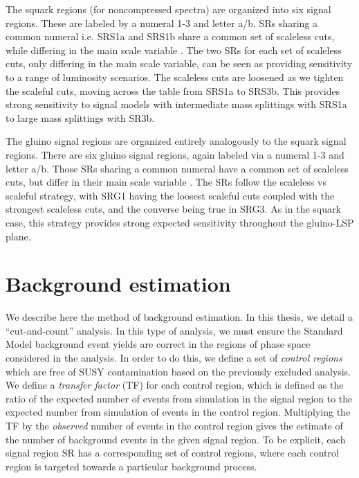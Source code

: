 The squark regions (for noncompressed spectra) are organized into six signal regions.
These are labeled by a numeral 1-3 and letter a/b.
SRs sharing a common numeral i.e. SRS1a and SRS1b share a common set of scaleless cuts, while differing in the main scale variable .
The two SRs for each set of scaleless cuts, only differing in the main scale variable, can be seen as providing sensitivity to a range of luminosity scenarios\footnotemark.
The scaleless cuts are loosened as we tighten the scaleful cuts, moving across the table from SRS1a to SRS3b.
This provides strong sensitivity to signal models with intermediate mass splittings with SRS1a to large mass splittings with SR3b.

The gluino signal regions are organized entirely analogously to the squark signal regions.
There are six gluino signal regions, again labeled via a numeral 1-3 and letter a/b.
Those SRs sharing a common numeral have a common set of scaleless cuts, but differ in their main scale variable .
The SRs follow the scaleless vs scaleful strategy, with SRG1 having the loosest scaleful cuts coupled with the strongest scaleless cuts, and the converse being true in SRG3.
As in the squark case, this strategy provides strong expected sensitivity throughout the gluino-LSP plane.



\section{Background estimation}

We describe here the method of background estimation.
In this thesis, we detail a ``cut-and-count'' analysis.
In this type of analysis, we must ensure the Standard Model background event yields are correct in the regions of phase space considered in the analysis.
In order to do this, we define a set of \textit{control regions} which are free of SUSY contamination based on the previously excluded analysis.
We define a \textit{transfer factor} (TF) for each control region, which is defined as the ratio of the expected number of events from simulation in the signal region to the expected number from simulation of events in the control region.
Multiplying the TF by the \textit{observed} number of events in the control region gives the estimate of the number of background events in the given signal region.
To be explicit, each signal region SR has a corresponding set of control regions, where each control region is targeted towards a particular background process.


